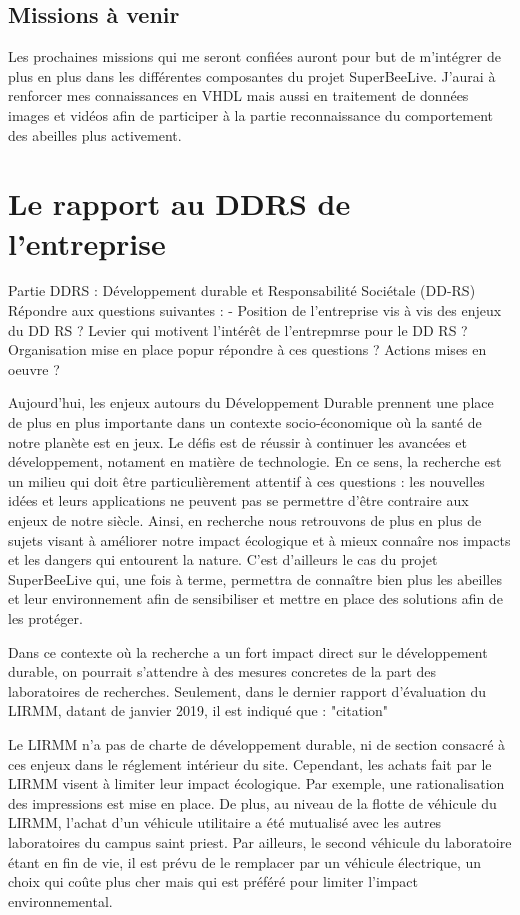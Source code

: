 \documentclass[11pt,french,a4paper]{report}
\begin{document}
{\section{Missions à venir}
Les prochaines missions qui me seront confiées auront pour but de m'intégrer de plus en plus dans les différentes composantes du projet
SuperBeeLive. J'aurai à renforcer mes connaissances en VHDL mais aussi en traitement de données images et vidéos afin de participer à 
la partie reconnaissance du comportement des abeilles plus activement. 

\chapter{Le rapport au DDRS de l'entreprise}
Partie DDRS : Développement durable et Responsabilité Sociétale (DD-RS) 
Répondre aux questions suivantes : 
- Position de l'entreprise vis à vis des enjeux du DD RS ? 
Levier qui motivent l'intérêt de l'entrepmrse pour le DD RS ? 
Organisation mise en place popur répondre à ces questions ? 
Actions mises en oeuvre ? 

Aujourd'hui, les enjeux autours du Développement Durable prennent une place
de plus en plus importante dans un contexte socio-économique où la santé de notre
planète est en jeux. Le défis est de réussir à continuer les avancées et développement, 
notament en matière de technologie. En ce sens, la recherche est un milieu qui doit être 
particulièrement attentif à ces questions : les nouvelles idées et leurs applications ne 
peuvent pas se permettre d'être contraire aux enjeux de notre siècle.
Ainsi, en recherche nous retrouvons de plus en plus de sujets visant à améliorer notre impact 
écologique et à mieux connaîre nos impacts et les dangers qui entourent la nature. 
C'est d'ailleurs le cas du projet SuperBeeLive qui, une fois à terme, permettra de connaître 
bien plus les abeilles et leur environnement afin de sensibiliser et mettre en place des solutions afin de les 
protéger.

Dans ce contexte où la recherche a un fort impact direct sur le développement durable, on pourrait 
s'attendre à des mesures concretes de la part des laboratoires de recherches. Seulement, dans le dernier
rapport d'évaluation du LIRMM, datant de janvier 2019, il est indiqué que :
"citation" 


Le LIRMM n'a pas de charte de développement durable, ni de section consacré à ces enjeux dans le réglement intérieur du site. Cependant, 
les achats fait par le LIRMM visent à limiter leur impact écologique. Par exemple, une rationalisation des impressions est mise en place. 
De plus, au niveau de la flotte de véhicule du LIRMM, l'achat d'un véhicule utilitaire a été mutualisé avec les autres laboratoires du campus 
saint priest. Par ailleurs, le second véhicule du laboratoire étant en fin de vie, il est prévu de le remplacer par un véhicule électrique, 
un choix qui coûte plus cher mais qui est préféré pour limiter l'impact environnemental.

}
\end{document}
